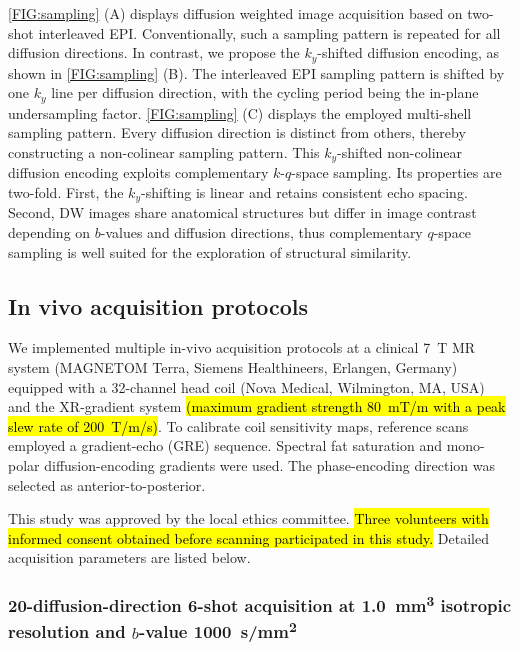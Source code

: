 \documentclass[preprint,12pt,authoryear,review]{elsarticle}
\begin{document}
    \cref{FIG:sampling} (A) displays diffusion weighted image acquisition
    based on two-shot interleaved EPI.
    Conventionally, such a sampling pattern is repeated for all diffusion directions.
    In contrast, we propose the $k_y$-shifted diffusion encoding,
    as shown in \cref{FIG:sampling} (B).
    The interleaved EPI sampling pattern is shifted by one $k_y$ line
    per diffusion direction,
    with the cycling period being the in-plane undersampling factor.
    \cref{FIG:sampling} (C) displays the employed multi-shell sampling pattern.
    Every diffusion direction is distinct from others,
    thereby constructing a non-colinear sampling pattern.
    This $k_y$-shifted non-colinear diffusion encoding exploits
    complementary $k$-$q$-space sampling. Its properties are two-fold.
    First, the $k_y$-shifting is linear and retains consistent echo spacing.
    Second, DW images share anatomical structures but differ in image contrast
    depending on $b$-values and diffusion directions,
    thus complementary $q$-space sampling is well suited
    for the exploration of structural similarity.

    \subsection{In vivo acquisition protocols}

    We implemented multiple in-vivo acquisition protocols
    at a clinical \SI{7}{\tesla} MR system
    (MAGNETOM Terra, Siemens Healthineers, Erlangen, Germany)
    equipped with a 32-channel head coil (Nova Medical, Wilmington, MA, USA)
    and the XR-gradient system
    \hl{(maximum gradient strength \mbox{\SI{80}{\milli\tesla / \meter}}
    with a peak slew rate of \mbox{\SI{200}{\tesla / \meter / \second}})}. 
    To calibrate coil sensitivity maps, reference scans employed a gradient-echo (GRE) sequence.
    Spectral fat saturation and mono-polar diffusion-encoding gradients were used.
    The phase-encoding direction was selected as anterior-to-posterior.

    This study was approved by the local ethics committee. 
    \hl{Three volunteers with informed consent obtained before scanning
    participated in this study.}
    Detailed acquisition parameters are listed below.

    \subsubsection{20-diffusion-direction 6-shot acquisition
    at \SI{1.0}{\cubic\milli\meter} isotropic resolution
    and $b$-value \SI{1000}{s/mm^2}}
    \label{SEC:ACQ_6shot}
\end{document}

